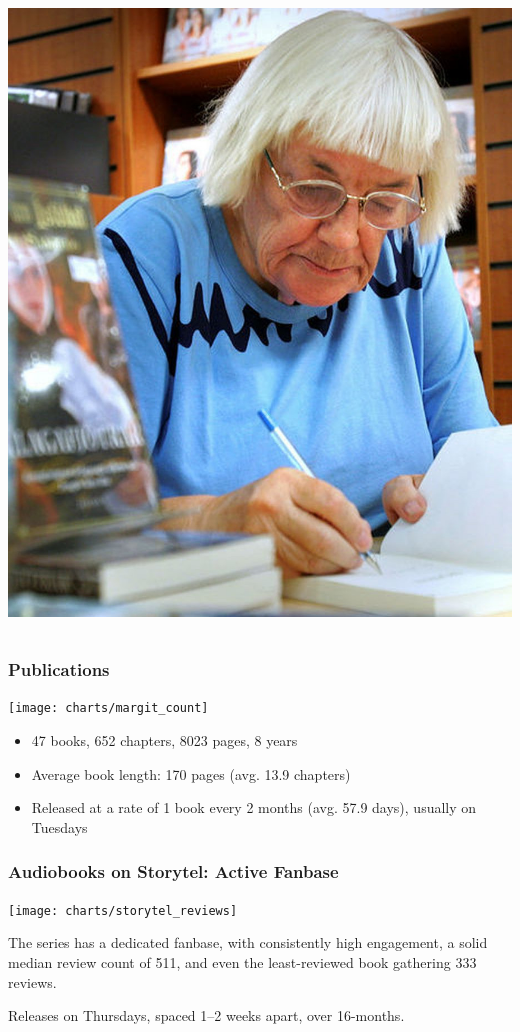 \documentclass{beamer}
\begin{document}
\begin{frame}
\begin{columns}[T]
\begin{column}{0.45\textwidth}
                \includegraphics[width=\textwidth]{figures/margit_sandemo}
            \end{column}
        \end{columns}
    \end{frame}

    \begin{frame}
        \frametitle{Publications}
        \texttt{[image: charts/margit\_count]}
        \vspace{-24pt}
        \begin{itemize}
            \item 47 books, 652 chapters, 8023 pages, 8 years
            \item Average book length: 170 pages (avg. 13.9 chapters)
            \item Released at a rate of 1 book every 2 months (avg. 57.9 days), usually on Tuesdays
        \end{itemize}
    \end{frame}

    \begin{frame}
        \frametitle{Audiobooks on Storytel: Active Fanbase}
        \texttt{[image: charts/storytel\_reviews]}

        The series has a dedicated fanbase, with consistently high engagement, a solid median review count of 511,
        and even the least-reviewed book gathering 333 reviews.

        Releases on Thursdays, spaced 1--2 weeks apart, over 16-months.

    \end{frame}
\end{document}
